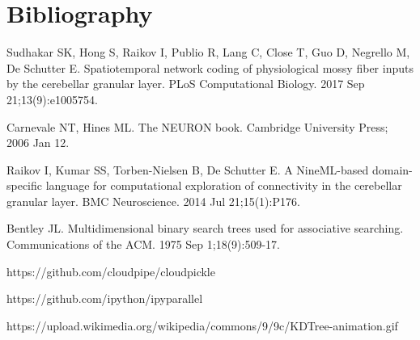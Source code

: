 \documentclass[12pt]{report}
\begin{document}






\newpage
\section*{Bibliography}


\begingroup
\renewcommand{\chapter}[2]{}%
\begin{thebibliography}{99}


 Sudhakar SK, Hong S, Raikov I, Publio R, Lang C, Close T, Guo D, Negrello M, De Schutter E. Spatiotemporal network coding of physiological mossy fiber inputs by the cerebellar granular layer. PLoS Computational Biology. 2017 Sep 21;13(9):e1005754.

 Carnevale NT, Hines ML. The NEURON book. Cambridge University Press; 2006 Jan 12.

 Raikov I, Kumar SS, Torben-Nielsen B, De Schutter E. A NineML-based domain-specific language for computational exploration of connectivity in the cerebellar granular layer. BMC Neuroscience. 2014 Jul 21;15(1):P176.

 Bentley JL. Multidimensional binary search trees used for associative searching. Communications of the ACM. 1975 Sep 1;18(9):509-17.

 https://github.com/cloudpipe/cloudpickle

 https://github.com/ipython/ipyparallel

 https://upload.wikimedia.org/wikipedia/commons/9/9c/KDTree-animation.gif

\end{thebibliography}

\endgroup
\end{document}
